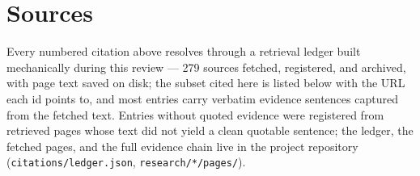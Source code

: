 \section*{Sources}

\footnotesize
\noindent
Every numbered citation above resolves through a retrieval ledger built mechanically during this review --- 279 sources fetched, registered, and archived, with page text saved on disk; the subset cited here is listed below with the URL each id points to, and most entries carry verbatim evidence sentences captured from the fetched text. Entries without quoted evidence were registered from retrieved pages whose text did not yield a clean quotable sentence; the ledger, the fetched pages, and the full evidence chain live in the project repository (\texttt{citations/ledger.json}, \texttt{research/*/pages/}).

\vspace{0.5em}

